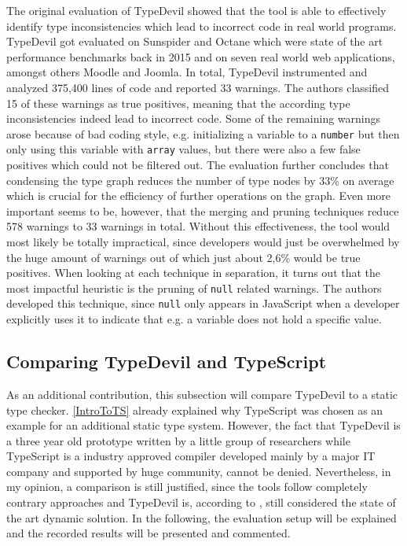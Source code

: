 \documentclass[runningheads,a4paper]{llncs}
\begin{document}
The original evaluation of TypeDevil showed that the tool is able to effectively identify type inconsistencies which lead to incorrect code in real world programs.
TypeDevil got evaluated on Sunspider and Octane which were state of the art performance benchmarks back in 2015 and on seven real world web applications, amongst others Moodle and Joomla.
In total, TypeDevil instrumented and analyzed 375,400 lines of code and reported 33 warnings.
The authors classified 15 of these warnings as true positives, meaning that the according type inconsistencies indeed lead to incorrect code.
Some of the remaining warnings arose because of bad coding style, e.g. initializing a variable to a \lstinline[columns=fixed]{number} but then only using this variable with \lstinline[columns=fixed]{array} values, but there were also a few false positives which could not be filtered out.
The evaluation further concludes that condensing the type graph reduces the number of type nodes by 33\% on average which is crucial for the efficiency of further operations on the graph.
Even more important seems to be, however, that the merging and pruning techniques reduce 578 warnings to 33 warnings in total.
Without this effectiveness, the tool would most likely be totally impractical, since developers would just be overwhelmed by the huge amount of warnings out of which just about 2,6\% would be true positives. 
When looking at each technique in separation, it turns out that the most impactful heuristic is the pruning of \lstinline[columns=fixed]{null} related warnings. 
The authors developed this technique, since \lstinline[columns=fixed]{null} only appears in JavaScript when a developer explicitly uses it to indicate that e.g. a variable does not hold a specific value.

\subsection{Comparing TypeDevil and TypeScript} \label{comparison}
As an additional contribution, this subsection will compare TypeDevil to a static type checker.
\ref{IntroToTS} already explained why TypeScript was chosen as an example for an additional static type system.
However, the fact that TypeDevil is a three year old prototype written by a little group of researchers while TypeScript is a industry approved compiler developed mainly by a major IT company and supported by huge community, cannot be denied.
Nevertheless, in my opinion, a comparison is still justified, since the tools follow completely contrary approaches and TypeDevil is, according to \cite{DBLP:conf/icse/TanXCLYS17}, still considered the state of the art dynamic solution.
In the following, the evaluation setup will be explained and the recorded results will be presented and commented. 
\end{document}
